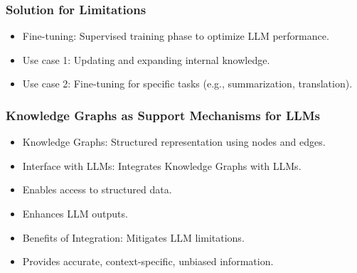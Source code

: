 \begin{frame}[fragile]\frametitle{Solution for Limitations}

\begin{itemize}
\item Fine-tuning: Supervised training phase to optimize LLM performance.
\item Use case 1: Updating and expanding internal knowledge.
\item Use case 2: Fine-tuning for specific tasks (e.g., summarization, translation).
\end{itemize}	

\end{frame}


\begin{frame}[fragile]\frametitle{Knowledge Graphs as Support Mechanisms for LLMs}

\begin{itemize}
\item Knowledge Graphs: Structured representation using nodes and edges.
\item Interface with LLMs: Integrates Knowledge Graphs with LLMs.
\item Enables access to structured data.
\item Enhances LLM outputs.
\item Benefits of Integration: Mitigates LLM limitations.
\item Provides accurate, context-specific, unbiased information.
\end{itemize}	

\end{frame}





